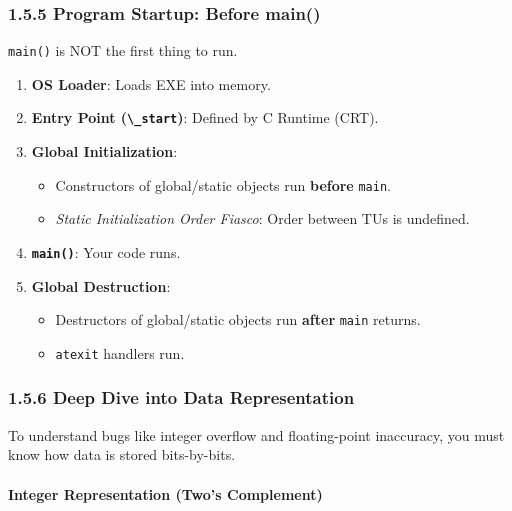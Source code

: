 \hypertarget{program-startup-before-main}{%
\subsubsection{1.5.5 Program Startup: Before
main()}\label{program-startup-before-main}}

\passthrough{\lstinline!main()!} is NOT the first thing to run.

\begin{enumerate}
\def\labelenumi{\arabic{enumi}.}
\tightlist
\item
  \textbf{OS Loader}: Loads EXE into memory.
\item
  \textbf{Entry Point (\passthrough{\lstinline!\_start!})}: Defined by C
  Runtime (CRT).
\item
  \textbf{Global Initialization}:

  \begin{itemize}
  \tightlist
  \item
    Constructors of global/static objects run \textbf{before}
    \passthrough{\lstinline!main!}.
  \item
    \emph{Static Initialization Order Fiasco}: Order between TUs is
    undefined.
  \end{itemize}
\item
  \textbf{\passthrough{\lstinline!main()!}}: Your code runs.
\item
  \textbf{Global Destruction}:

  \begin{itemize}
  \tightlist
  \item
    Destructors of global/static objects run \textbf{after}
    \passthrough{\lstinline!main!} returns.
  \item
    \passthrough{\lstinline!atexit!} handlers run.
  \end{itemize}
\end{enumerate}

\hypertarget{deep-dive-into-data-representation}{%
\subsubsection{1.5.6 Deep Dive into Data
Representation}\label{deep-dive-into-data-representation}}

To understand bugs like integer overflow and floating-point inaccuracy,
you must know how data is stored bits-by-bits.

\hypertarget{integer-representation-twos-complement}{%
\paragraph{Integer Representation (Two's
Complement)}\label{integer-representation-twos-complement}}


